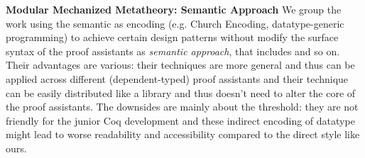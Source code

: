 \textbf{Modular Mechanized Metatheory: Semantic Approach} We group the work using the semantic as encoding (e.g. Church Encoding, datatype-generic programming) to achieve certain design patterns without modify the surface syntax of the proof assistants as \textit{semantic approach}, that includes \citet{delaware2013,forsta2020,liwei2022,schwaab2013modular, keuchel2013generic} and so on. Their advantages are various: their techniques are more general and thus can be applied across different (dependent-typed) proof assistants and their technique can be easily distributed like a library and thus doesn't need to alter the core of the proof assistants. The downsides are mainly about the threshold: they are not friendly for the junior Coq development and these indirect encoding of datatype might lead to worse readability and accessibility compared to the direct style like ours.

\fi